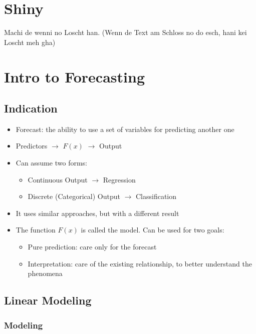 \documentclass[a4paper]{article}
\begin{document}
		\newpage
		
	\section{Shiny}
	
	Machi de wenni no Loscht han.
	(Wenn de Text am Schloss no do esch, hani kei Loscht meh gha)
	
	\section{Intro to Forecasting}
	
		\subsection{Indication}
		
		\begin{itemize}
			\item Forecast: the ability to use a set of variables for predicting another one
			\item Predictors $\rightarrow$ $F(x)$ $\rightarrow$ Output
			\item Can assume two forms:
				\begin{itemize}
					\item Continuous Output $\rightarrow$ Regression
					\item Discrete (Categorical) Output $\rightarrow$ Classification
				\end{itemize}
			\item It uses similar approaches, but with a different result
			\item The function $F(x)$ is called the model.
				Can be used for two goals:
				\begin{itemize}
					\item Pure prediction: care only for the forecast
					\item Interpretation: care of the existing relationship, to better understand the phenomena
				\end{itemize}
		\end{itemize}
	
		\subsection{Linear Modeling}
		
			\subsubsection{Modeling}
			
\end{document}
